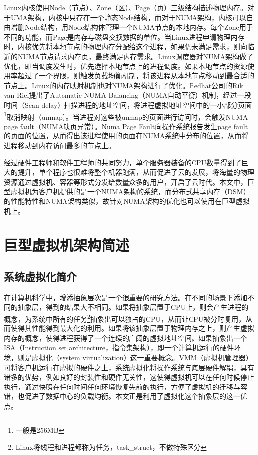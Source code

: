 Linux内核使用Node（节点）、Zone（区）、Page（页）三级结构描述物理内存\cite{phymem}。对于UMA架构，内核中只存在一个静态Node结构，而对于NUMA架构，内核可以自由增删Node结构，用Node结构体管理一个NUMA节点的本地内存。每个Zone用于不同的功能，而Page是内存与磁盘交换数据的单位。当Linux进程申请物理内存时，内核优先将本地节点的物理内存分配给这个进程，如果仍未满足需求，则向临近的NUMA节点请求内存页，最终满足内存需求。Linux调度器对NUMA架构做了优化，即当调度发生时，优先选择本地节点上的进程调度。如果本地节点的资源使用率超过了一个界限，则触发负载均衡机制，将该进程从本地节点移动到最合适的节点上。Linux的内存映射机制也对NUMA架构进行了优化。Redhat公司的Rik van Riel提出了Automatic NUMA Balancing（NUMA自动平衡）机制\cite{balancing}，经过一段时间（Scan delay）扫描进程的地址空间，将进程虚拟地址空间中的一小部分页面\footnote{一般是256MB}取消映射（unmap）。当进程对这些被unmap的页面进行访问时，会触发NUMA page fault（NUMA缺页异常）。Numa Page Fault向操作系统报告发生page fault的页面的位置，从而得出该进程使用的页面在NUMA系统中分布的位置，从而将进程移动到内存访问最多的节点上。

经过硬件工程师和软件工程师的共同努力，单个服务器装备的CPU数量得到了巨大的提升，单个程序也很难将整个机器跑满，从而促进了云的发展，将海量的物理资源通过虚拟机、容器等形式分发给数量众多的用户，开启了云时代。本文中，巨型虚拟机为客户机提供的是一个NUMA架构的系统，而分布式共享内存（DSM）的性能特性和NUMA架构类似，故针对NUMA架构的优化也可以使用在巨型虚拟机上。

\section{巨型虚拟机架构简述}
\subsection{系统虚拟化简介}
在计算机科学中，增添抽象层次是一个很重要的研究方法。在不同的场景下添加不同的抽象层，得到的结果大不相同。如果将抽象层置于CPU上，则会产生进程的概念，为系统中所有的任务\footnote{Linux将线程和进程都称为任务，task\_struct，不做特殊区分}抽象出可以独占的CPU，从而让CPU被分时复用，从而使得其性能得到最大化的利用。如果将该抽象层置于物理内存之上，则产生虚拟内存的概念，使得进程获得了一个连续的广阔的虚拟地址空间。如果抽象出一个ISA（Instruction set architecture，指令集架构），即一个计算机运行的硬件环境，则是虚拟化（system virtualization）这一重要概念。VMM（虚拟机管理器）可将客户机运行在虚拟的硬件之上，系统虚拟化将操作系统与底层硬件解耦，具有诸多的优势，例如良好的封装性和硬件无关性\cite{sysv}，这使得虚拟机可以在任何时候停止执行，通过快照在任何时间任何环境恢复先前的执行，方便了虚拟机的迁移与容错，也促进了数据中心的负载均衡。本文正是利用了虚拟化这个抽象层的这一优点。

